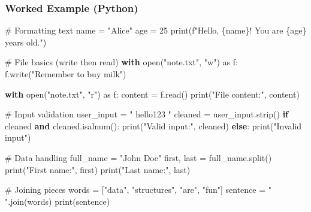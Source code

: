 \documentclass[
  letterpaper,
  DIV=11,
  numbers=noendperiod]{scrreprt}
\newenvironment{Shaded}{\begin{snugshade}}{\end{snugshade}}
\newcommand{\BuiltInTok}[1]{\textcolor[rgb]{0.00,0.23,0.31}{#1}}
\newcommand{\CommentTok}[1]{\textcolor[rgb]{0.37,0.37,0.37}{#1}}
\newcommand{\ControlFlowTok}[1]{\textcolor[rgb]{0.00,0.23,0.31}{\textbf{#1}}}
\newcommand{\DecValTok}[1]{\textcolor[rgb]{0.68,0.00,0.00}{#1}}
\newcommand{\ImportTok}[1]{\textcolor[rgb]{0.00,0.46,0.62}{#1}}
\newcommand{\KeywordTok}[1]{\textcolor[rgb]{0.00,0.23,0.31}{\textbf{#1}}}
\newcommand{\NormalTok}[1]{\textcolor[rgb]{0.00,0.23,0.31}{#1}}
\newcommand{\OperatorTok}[1]{\textcolor[rgb]{0.37,0.37,0.37}{#1}}
\newcommand{\SpecialCharTok}[1]{\textcolor[rgb]{0.37,0.37,0.37}{#1}}
\newcommand{\SpecialStringTok}[1]{\textcolor[rgb]{0.13,0.47,0.30}{#1}}
\newcommand{\StringTok}[1]{\textcolor[rgb]{0.13,0.47,0.30}{#1}}
\begin{document}
\subsubsection{Worked Example (Python)}\label{worked-example-python-16}

\begin{Shaded}
\begin{Highlighting}[]
\CommentTok{\# Formatting text}
\NormalTok{name }\OperatorTok{=} \StringTok{"Alice"}
\NormalTok{age }\OperatorTok{=} \DecValTok{25}
\BuiltInTok{print}\NormalTok{(}\SpecialStringTok{f"Hello, }\SpecialCharTok{\{}\NormalTok{name}\SpecialCharTok{\}}\SpecialStringTok{! You are }\SpecialCharTok{\{}\NormalTok{age}\SpecialCharTok{\}}\SpecialStringTok{ years old."}\NormalTok{)}

\CommentTok{\# File basics (write then read)}
\ControlFlowTok{with} \BuiltInTok{open}\NormalTok{(}\StringTok{"note.txt"}\NormalTok{, }\StringTok{"w"}\NormalTok{) }\ImportTok{as}\NormalTok{ f:}
\NormalTok{    f.write(}\StringTok{"Remember to buy milk"}\NormalTok{)}

\ControlFlowTok{with} \BuiltInTok{open}\NormalTok{(}\StringTok{"note.txt"}\NormalTok{, }\StringTok{"r"}\NormalTok{) }\ImportTok{as}\NormalTok{ f:}
\NormalTok{    content }\OperatorTok{=}\NormalTok{ f.read()}
\BuiltInTok{print}\NormalTok{(}\StringTok{"File content:"}\NormalTok{, content)}

\CommentTok{\# Input validation}
\NormalTok{user\_input }\OperatorTok{=} \StringTok{"   hello123   "}
\NormalTok{cleaned }\OperatorTok{=}\NormalTok{ user\_input.strip()}
\ControlFlowTok{if}\NormalTok{ cleaned }\KeywordTok{and}\NormalTok{ cleaned.isalnum():}
    \BuiltInTok{print}\NormalTok{(}\StringTok{"Valid input:"}\NormalTok{, cleaned)}
\ControlFlowTok{else}\NormalTok{:}
    \BuiltInTok{print}\NormalTok{(}\StringTok{"Invalid input"}\NormalTok{)}

\CommentTok{\# Data handling}
\NormalTok{full\_name }\OperatorTok{=} \StringTok{"John Doe"}
\NormalTok{first, last }\OperatorTok{=}\NormalTok{ full\_name.split()}
\BuiltInTok{print}\NormalTok{(}\StringTok{"First name:"}\NormalTok{, first)}
\BuiltInTok{print}\NormalTok{(}\StringTok{"Last name:"}\NormalTok{, last)}

\CommentTok{\# Joining pieces}
\NormalTok{words }\OperatorTok{=}\NormalTok{ [}\StringTok{"data"}\NormalTok{, }\StringTok{"structures"}\NormalTok{, }\StringTok{"are"}\NormalTok{, }\StringTok{"fun"}\NormalTok{]}
\NormalTok{sentence }\OperatorTok{=} \StringTok{" "}\NormalTok{.join(words)}
\BuiltInTok{print}\NormalTok{(sentence)}
\end{Highlighting}
\end{Shaded}
\end{document}
